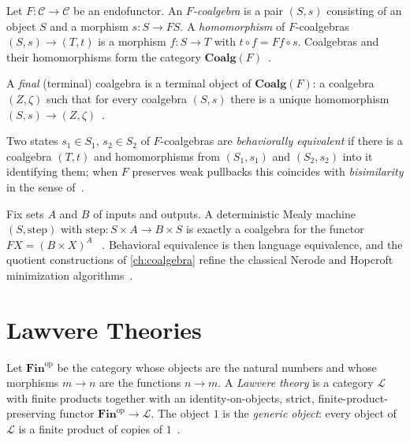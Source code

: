 \begin{definition}
Let $F \colon \mathcal{C} \to \mathcal{C}$ be an endofunctor. An
\emph{$F$-coalgebra} is a pair $(S, s)$ consisting of an object $S$ and a
morphism $s \colon S \to F S$. A \emph{homomorphism} of $F$-coalgebras
$(S,s) \to (T,t)$ is a morphism $f \colon S \to T$ with
$t \circ f = F f \circ s$. Coalgebras and their homomorphisms form the
category $\mathbf{Coalg} (F)$~\cite{arxiv-coalgebra-min}.
\end{definition}

\begin{definition}
A \emph{final} (terminal) coalgebra is a terminal object of
$\mathbf{Coalg} (F)$: a coalgebra $(Z, \zeta)$ such that for every coalgebra
$(S,s)$ there is a unique homomorphism $(S,s) \to (Z,\zeta)$~\cite{arxiv-coalgebra-min}.
\end{definition}

\begin{definition}
Two states $s_1 \in S_1$, $s_2 \in S_2$ of $F$-coalgebras are
\emph{behaviorally equivalent} if there is a coalgebra $(T,t)$ and
homomorphisms from $(S_1,s_1)$ and $(S_2,s_2)$ into it identifying them; when
$F$ preserves weak pullbacks this coincides with \emph{bisimilarity} in the
sense of~\cite{park, arxiv-coalgebra-min}.
\end{definition}

\begin{example}
Fix sets $A$ and $B$ of inputs and outputs. A deterministic Mealy machine
$(S, \mathrm{step})$ with $\mathrm{step} \colon S \times A \to B \times S$
is exactly a coalgebra for the functor $F X = (B \times X)^A$
~\cite{mealy, moore, arxiv-mealy}. Behavioral equivalence is then language
equivalence, and the quotient constructions of \autoref{ch:coalgebra}
refine the classical Nerode and Hopcroft minimization
algorithms~\cite{nerode, hopcroft, arxiv-coalgebra-min}.
\end{example}

\section{Lawvere Theories}\label{sec:prelim-lawvere}

\begin{definition}
Let $\mathbf{Fin}^{\mathrm{op}}$ be the category whose objects are the
natural numbers and whose morphisms $m \to n$ are the functions $n \to m$.
A \emph{Lawvere theory} is a category $\mathcal{L}$ with finite products
together with an identity-on-objects, strict, finite-product-preserving
functor $\mathbf{Fin}^{\mathrm{op}} \to \mathcal{L}$. The object $1$ is the
\emph{generic object}: every object of $\mathcal{L}$ is a finite product of
copies of $1$~\cite{lawvere, arxiv-lawvere}.
\end{definition}

